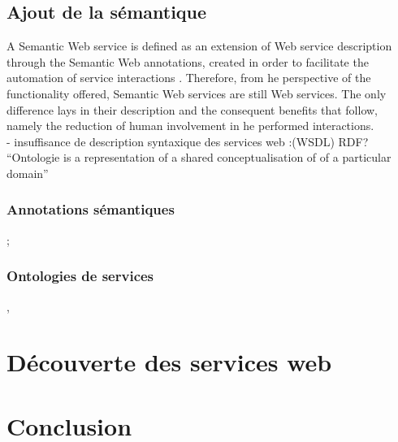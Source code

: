         \subsection{Ajout de la sémantique}
	    A Semantic Web service is defined as an extension of Web service description through the Semantic Web annotations,
	    created in order to facilitate the automation of service interactions . Therefore, from 
	    he perspective of the functionality offered, Semantic Web services are still Web services. The only difference lays
	    in their description and the consequent benefits that follow, namely the reduction of human involvement in 
	    he performed interactions.\\

	    - insuffisance de description syntaxique des services web :(WSDL)
	     RDF? \cite{lassila1999resource}\\
	    ``Ontologie is a representation of a shared conceptualisation of of a particular domain'' 

	\subsubsection{Annotations sémantiques};
	\subsubsection{Ontologies de services} 
	  \cite{mcguinness2004owl} , \cite{mcilraith2003bringing}

\section{Découverte des services web}

\section{Conclusion}

